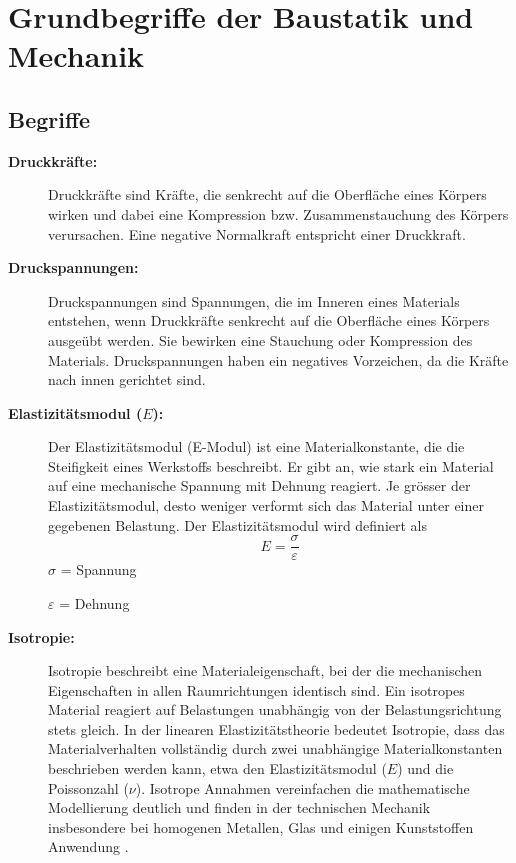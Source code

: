 %
%
%
%
\section{Grundbegriffe der Baustatik und Mechanik}
\label{elastomechanik:section:teil1}
\subsection{Begriffe}
\begin{description}	
	\item[\textbf{Druckkräfte:}] Druckkräfte sind Kräfte, die senkrecht auf die Oberfläche eines Körpers wirken und dabei eine Kompression bzw. Zusammenstauchung des Körpers verursachen. 
	Eine negative Normalkraft entspricht einer Druckkraft.
	
	\item[\textbf{Druckspannungen:}] Druckspannungen sind Spannungen, die im Inneren eines Materials entstehen, wenn Druckkräfte senkrecht auf die Oberfläche eines Körpers ausgeübt werden. 
	Sie bewirken eine Stauchung oder Kompression des Materials.
	Druckspannungen haben ein negatives Vorzeichen, da die Kräfte nach innen gerichtet sind.
	
	\item[\textbf{Elastizitätsmodul ($E$):}] Der Elastizitätsmodul (E-Modul) ist eine Materialkonstante, die die Steifigkeit eines Werkstoffs beschreibt. 
	Er gibt an, wie stark ein Material auf eine mechanische Spannung mit Dehnung reagiert. 
	Je grösser der Elastizitätsmodul, desto weniger verformt sich das Material unter einer gegebenen Belastung.
	Der Elastizitätsmodul wird definiert als
	\begin{equation}
		E=
		\frac{\sigma}{\varepsilon}
	\end{equation}
	$\sigma$ = Spannung
	
	$\varepsilon$ = Dehnung
	
	\item[\textbf{Isotropie:}] Isotropie beschreibt eine Materialeigenschaft, bei der die mechanischen Eigenschaften in allen Raumrichtungen identisch sind. 
	Ein isotropes Material reagiert auf Belastungen unabhängig von der Belastungsrichtung stets gleich.
	In der linearen Elastizitätstheorie bedeutet Isotropie, dass das Materialverhalten vollständig durch zwei unabhängige Materialkonstanten beschrieben werden kann, etwa den Elastizitätsmodul ($E$) und die Poissonzahl ($\nu$).  
	Isotrope Annahmen vereinfachen die mathematische Modellierung deutlich und finden in der technischen Mechanik insbesondere bei homogenen Metallen, Glas und einigen Kunststoffen Anwendung \cite{elastomechanik:Isotropie}.
	

\end{description}

